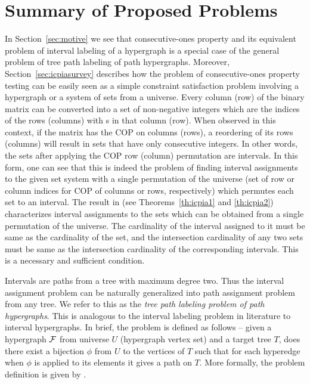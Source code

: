 \section[Summary of problems]{Summary of Proposed Problems}
\label{sec:myresearchintro}
In Section~\ref{sec:motive} we see that consecutive-ones property and
its equivalent problem of interval labeling of a hypergraph is a
special case of the general problem of tree path labeling of path
hypergraphs. Moreover, Section~\ref{sec:icpiasurvey} describes how the
problem of consecutive-ones property testing can be easily seen as a
simple constraint satisfaction problem involving a hypergraph or a
system of sets from a universe. Every column (row) of the binary
matrix can be converted into a set of non-negative integers which are
the indices of the rows (columns) with {\un}s in that column
(row). When observed in this context, if the matrix has the COP on
columns (rows), a reordering of its rows (columns) will result in sets
that have only consecutive integers. In other words, the sets after
applying the COP row (column) permutation are intervals.  In this
form, one can see that this is indeed the problem of finding interval
assignments to the given set system with a single permutation of the
universe (set of row or column indices for COP of columns or rows,
respectively) which permutes each set to an interval. The result in
\cite{nsnrs09} (see Theorems~\ref{th:icpia1} and \ref{th:icpia2})
characterizes interval assignments to the sets which can be obtained
from a single permutation of the universe. The cardinality of the
interval assigned to it must be same as the cardinality of the set,
and the intersection cardinality of any two sets must be same as the
intersection cardinality of the corresponding intervals. This is a
necessary and sufficient condition.

Intervals are paths from a tree with maximum degree two. Thus the
interval assignment problem can be naturally generalized into path
assignment problem from any tree. We refer to this as the {\em tree
  path labeling problem of path hypergraphs}. This is analogous to the
interval labeling problem in literature \cite{kklv10} to interval
hypergraphs. In brief, the problem is defined as follows -- given a
hypergraph ${\cal F}$ from universe $U$ (\ie hypergraph vertex set) and a
target tree $T$, does there exist a bijection $\phi$ from $U$ to the
vertices of $T$ such that for each hyperedge when $\phi$ is applied to
its elements it gives a path on $T$.  More formally, the problem
definition is given by \CFTPL.

